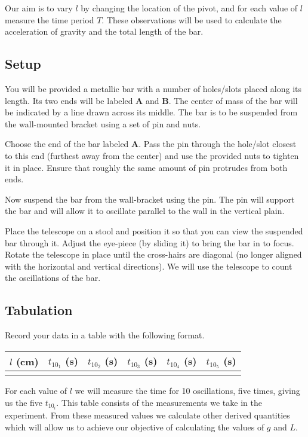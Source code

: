 \documentclass{article}
\begin{document}
      Our aim is to vary $l$ by changing the location of the pivot, and for each value of $l$ measure the time period $T$. These observations will be used to calculate the acceleration of gravity and the total length of the bar.

      \subsection*{Setup}

         You will be provided a metallic bar with a number of holes/slots placed along its length. Its two ends will be labeled \textbf{A} and \textbf{B}. The center of mass of the bar will be indicated by a line drawn across its middle. The bar is to be suspended from the wall-mounted bracket using a set of pin and nuts.

         Choose the end of the bar labeled \textbf{A}. Pass the pin through the hole/slot closest to this end (furthest away from the center) and use the provided nuts to tighten it in place. Ensure that roughly the same amount of pin protrudes from both ends.

         Now suspend the bar from the wall-bracket using the pin. The pin will support the bar and will allow it to oscillate parallel to the wall in the vertical plain.

         Place the telescope on a stool and position it so that you can view the suspended bar through it. Adjust the eye-piece (by sliding it) to bring the bar in to focus. Rotate the telescope in place until the cross-hairs are diagonal (no longer aligned with the horizontal and vertical directions). We will use the telescope to count the oscillations of the bar.

      \subsection*{Tabulation}

         Record your data in a table with the following format.

         \begin{table}[h]
            \centering

            \begin{tabular}{| c | c | c | c | c | c |}

               \hline
               $l$ (\si{\centi\metre}) & $t_{10_1}$ (\si{\second}) & $t_{10_2}$ (\si{\second}) & $t_{10_3}$ (\si{\second}) & $t_{10_4}$ (\si{\second}) & $t_{10_5}$ (\si{\second}) \\

               \hline
                  & & & & & \\
               \hline

            \end{tabular}
         \end{table}
         For each value of $l$ we will measure the time for 10 oscillations, five times, giving us the five $t_{10_i}$. This table consists of the measurements we take in the experiment. From these measured values we calculate other derived quantities which will allow us to achieve our objective of calculating the values of $g$ and $L$. 
         
\end{document}
